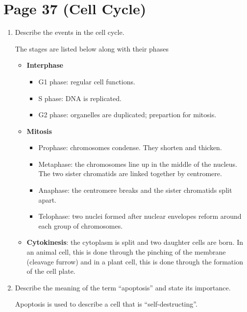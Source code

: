 \documentclass[12pt]{report}
\begin{document}
\section{Page 37 (Cell Cycle)}
\begin{enumerate}
\setlength\itemsep{1em}
    \item{Describe the events in the cell cycle.}
        \begin{solution}
            The stages are listed below along with their phases 
            \begin{itemize}
                \item{ \textbf{Interphase}}
                    \begin{itemize}
                        \item{G1 phase: regular cell functions.}
                        \item{S phase: DNA is replicated.}
                        \item{G2 phase: organelles are duplicated; prepartion for mitosis.}
                    \end{itemize}
                \item{ \textbf{Mitosis}}
                    \begin{itemize}
                        \item{Prophase: chromosomes condense. They shorten and thicken.}
                        \item{Metaphase: the chromosomes line up in the middle of the nucleus. The two sister chromatids are linked together by centromere.}
                        \item{Anaphase: the centromere breaks and the sister chromatids split apart.}
                        \item{Telophase: two nuclei formed after nuclear envelopes reform around each group of chromosomes.}
                    \end{itemize}
                \item{\textbf{Cytokinesis}: the cytoplasm is split and two daughter cells are born. In an animal cell, this is done through the pinching of the membrane (cleavage furrow) and in a plant cell, this is done through the formation of the cell plate.}
            \end{itemize}
        \end{solution}

        \item{Describe the meaning of the term ``apoptosis'' and state its importance.}
            \begin{solution}
                Apoptosis is used to describe a cell that is ``self-destructing''. 
            \end{solution}


\end{enumerate}
\end{document}
